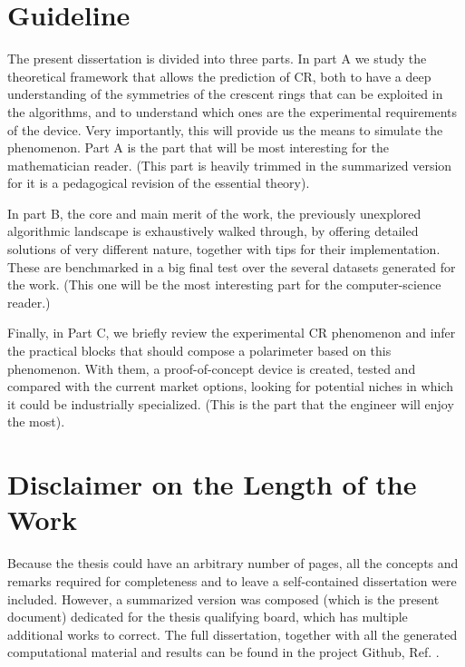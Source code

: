 \documentclass[11pt, a4paper, twoside]{article} %
\begin{document}

\section*{Guideline}\vspace{-0.1cm}
The present dissertation is divided into three parts. In part A we study the theoretical framework that allows the prediction of CR, both to have a deep understanding of the symmetries of the crescent rings that can be exploited in the algorithms, and to understand which ones are the experimental requirements of the device. Very importantly, this will provide us the means to simulate the phenomenon. Part A is the part that will be most interesting for the mathematician reader. (This part is heavily trimmed in the summarized version for it is a pedagogical revision of the essential theory).

 In part B, the core and main merit of the work, the previously unexplored algorithmic landscape is exhaustively walked through, by offering detailed solutions of very different nature, together with tips for their implementation. These are benchmarked in a big final test over the several datasets generated for the work. (This one will be the most interesting part for the computer-science reader.)

Finally, in Part C, we briefly review the experimental CR phenomenon and infer the practical blocks that should compose a polarimeter based on this phenomenon. With them, a proof-of-concept device is created, tested and compared with the current market options, looking for potential niches in which it could be industrially specialized. (This is the part that the engineer will enjoy the most).

\section*{Disclaimer on the Length of the Work\vspace{-0.1cm}}


Because the thesis could have an arbitrary number of pages, all the concepts and remarks required for completeness and to leave a self-contained dissertation were included. However, a summarized version was composed (which is the present document) dedicated for the thesis qualifying board, which has multiple additional works to correct. The full dissertation, together with all the generated computational material and results can be found in the project Github, Ref. \cite{github}.
\end{document}
